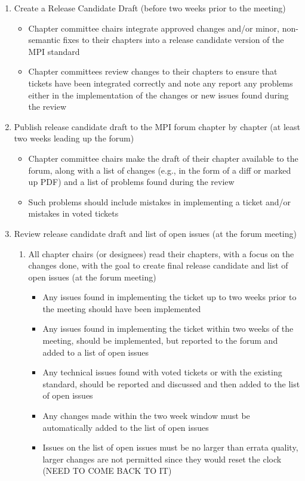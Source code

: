 \begin{enumerate}
\item Create a Release Candidate Draft (before two weeks prior to the meeting)
\begin{itemize}
\item Chapter committee chairs integrate approved changes and/or minor, non-semantic fixes to their chapters into a release candidate version of the MPI standard
\item Chapter committees review changes to their chapters to ensure that tickets have been integrated correctly and note any report any problems either in the implementation of the changes or new issues found during the review
\end{itemize}
\item Publish release candidate draft to the MPI forum chapter by chapter (at least two weeks leading up the forum)
\begin{itemize}
\item Chapter committee chairs make the draft of their chapter available to the forum, along with a list of changes (e.g., in the form of a diff or marked up PDF) and a list of problems found during the review
\item Such problems should include mistakes in implementing a ticket and/or mistakes in voted tickets
\end{itemize}
\item Review release candidate draft and list of open issues (at the forum meeting)
\begin{enumerate}
\item All chapter chairs (or designees) read their chapters, with a focus on the changes done, with the goal to create final release candidate and list of open issues (at the forum meeting)
\begin{itemize}
\item Any issues found in implementing the ticket up to two weeks prior to the meeting should have been implemented
\item Any issues found in implementing the ticket within two weeks of the meeting, should be implemented, but reported to the forum and added to a list of open issues
\item Any technical issues found with voted tickets or with the existing standard, should be reported and discussed and then added to the list of open issues
\item Any changes made within the two week window must be automatically added to the list of open issues
\item Issues on the list of open issues must be no larger than errata quality, larger changes are not permitted since they would reset the clock (NEED TO COME BACK TO IT)
\end{itemize}




\end{enumerate}
\end{enumerate}
